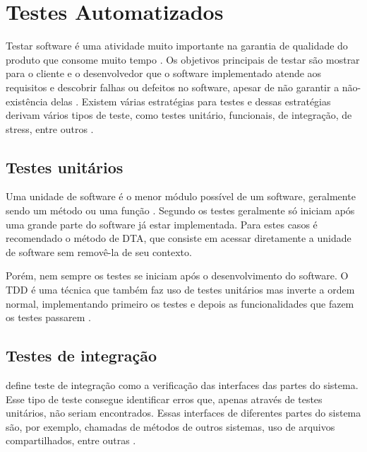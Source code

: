 \section{Testes Automatizados}

Testar software é uma atividade muito importante na garantia de qualidade do produto que consome muito tempo \cite{testing-is-hard}. Os objetivos principais de testar são mostrar para o cliente e o desenvolvedor que o software implementado atende aos requisitos e descobrir falhas ou defeitos no software, apesar de não garantir a não-existência delas \cite{sommerville}. Existem várias estratégias para testes e dessas estratégias derivam vários tipos de teste, como testes unitário, funcionais, de integração, de stress, entre outros \cite{art-of-testing}.

\subsection{Testes unitários}

Uma unidade de software é o menor módulo possível de um software, geralmente sendo um método ou uma função \cite{runeson}. Segundo  os testes geralmente só iniciam após uma grande parte do software já estar implementada. Para estes casos é recomendado o método de DTA, que consiste em acessar diretamente a unidade de software sem removê-la de seu contexto.

Porém, nem sempre os testes se iniciam após o desenvolvimento do software. O TDD é uma técnica que também faz uso de testes unitários mas inverte a ordem normal, implementando primeiro os testes e depois as funcionalidades que fazem os testes passarem \cite{tdd}.

\subsection{Testes de integração}

 define teste de integração como a verificação das interfaces das partes do sistema. Esse tipo de teste consegue identificar erros que, apenas através de testes unitários, não seriam encontrados. Essas interfaces de diferentes partes do sistema são, por exemplo, chamadas de métodos de outros sistemas, uso de arquivos compartilhados, entre outras \cite{spillner}.



